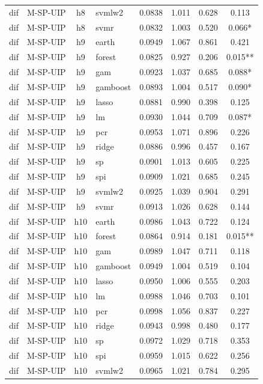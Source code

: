 \begin{ThreePartTable}
\begin{longtable}[t]{llclcccc}
dif & M-SP-UIP & h8 & svmlw2 & 0.0838 & 1.011 & 0.628 & 0.113\\
dif & M-SP-UIP & h8 & svmr & 0.0832 & 1.003 & 0.520 & 0.066*\\
\addlinespace
dif & M-SP-UIP & h9 & earth & 0.0949 & 1.067 & 0.861 & 0.421\\
dif & M-SP-UIP & h9 & forest & 0.0825 & 0.927 & 0.206 & 0.015**\\
dif & M-SP-UIP & h9 & gam & 0.0923 & 1.037 & 0.685 & 0.088*\\
dif & M-SP-UIP & h9 & gamboost & 0.0893 & 1.004 & 0.517 & 0.090*\\
dif & M-SP-UIP & h9 & lasso & 0.0881 & 0.990 & 0.398 & 0.125\\
dif & M-SP-UIP & h9 & lm & 0.0930 & 1.044 & 0.709 & 0.087*\\
dif & M-SP-UIP & h9 & pcr & 0.0953 & 1.071 & 0.896 & 0.226\\
dif & M-SP-UIP & h9 & ridge & 0.0886 & 0.996 & 0.457 & 0.167\\
dif & M-SP-UIP & h9 & sp & 0.0901 & 1.013 & 0.605 & 0.225\\
dif & M-SP-UIP & h9 & spi & 0.0909 & 1.021 & 0.685 & 0.245\\
dif & M-SP-UIP & h9 & svmlw2 & 0.0925 & 1.039 & 0.904 & 0.291\\
dif & M-SP-UIP & h9 & svmr & 0.0913 & 1.026 & 0.628 & 0.144\\
\addlinespace
dif & M-SP-UIP & h10 & earth & 0.0986 & 1.043 & 0.722 & 0.124\\
dif & M-SP-UIP & h10 & forest & 0.0864 & 0.914 & 0.181 & 0.015**\\
dif & M-SP-UIP & h10 & gam & 0.0989 & 1.047 & 0.711 & 0.118\\
dif & M-SP-UIP & h10 & gamboost & 0.0949 & 1.004 & 0.519 & 0.104\\
dif & M-SP-UIP & h10 & lasso & 0.0950 & 1.006 & 0.555 & 0.203\\
dif & M-SP-UIP & h10 & lm & 0.0988 & 1.046 & 0.703 & 0.101\\
dif & M-SP-UIP & h10 & pcr & 0.0998 & 1.056 & 0.837 & 0.227\\
dif & M-SP-UIP & h10 & ridge & 0.0943 & 0.998 & 0.480 & 0.177\\
dif & M-SP-UIP & h10 & sp & 0.0972 & 1.029 & 0.718 & 0.353\\
dif & M-SP-UIP & h10 & spi & 0.0959 & 1.015 & 0.622 & 0.256\\
dif & M-SP-UIP & h10 & svmlw2 & 0.0965 & 1.021 & 0.784 & 0.295\\

\end{longtable}
\end{ThreePartTable}
